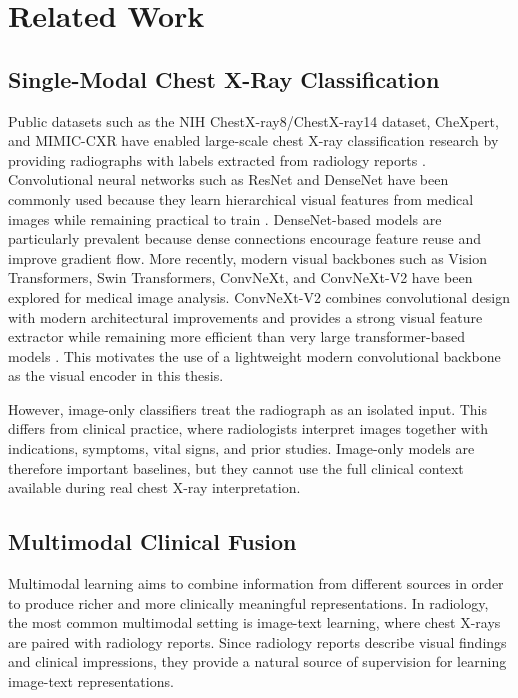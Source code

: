 \section{Related Work}
\label{sec:related_work}

\subsection{Single-Modal Chest X-Ray Classification}
\label{subsec:related_single_modal}

Public datasets such as the NIH ChestX-ray8/ChestX-ray14 dataset, CheXpert, and MIMIC-CXR have enabled large-scale chest X-ray classification research by providing radiographs with labels extracted from radiology reports \cite{wang2017chestxray8,irvin2019chexpert,johnson2019mimiccxr}. Convolutional neural networks such as ResNet and DenseNet have been commonly used because they learn hierarchical visual features from medical images while remaining practical to train \cite{he2016resnet,huang2017densenet}. DenseNet-based models are particularly prevalent because dense connections encourage feature reuse and improve gradient flow. More recently, modern visual backbones such as Vision Transformers, Swin Transformers, ConvNeXt, and ConvNeXt-V2 have been explored for medical image analysis. ConvNeXt-V2 combines convolutional design with modern architectural improvements and provides a strong visual feature extractor while remaining more efficient than very large transformer-based models \cite{woo2023convnextv2}. This motivates the use of a lightweight modern convolutional backbone as the visual encoder in this thesis.

However, image-only classifiers treat the radiograph as an isolated input. This differs from clinical practice, where radiologists interpret images together with indications, symptoms, vital signs, and prior studies. Image-only models are therefore important baselines, but they cannot use the full clinical context available during real chest X-ray interpretation.

\subsection{Multimodal Clinical Fusion}
\label{subsec:related_multimodal}

Multimodal learning aims to combine information from different sources in order to produce richer and more clinically meaningful representations. In radiology, the most common multimodal setting is image-text learning, where chest X-rays are paired with radiology reports. Since radiology reports describe visual findings and clinical impressions, they provide a natural source of supervision for learning image-text representations.

